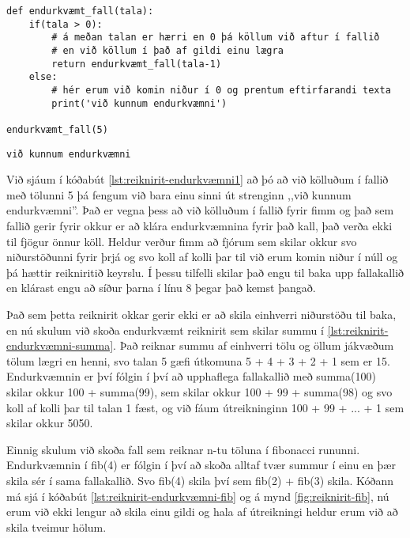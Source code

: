 \begin{lstlisting}[caption=Endurkvæmni - einfalt, label=lst:reiknirit-endurkvæmni1]
def endurkvæmt_fall(tala):
	if(tala > 0):
		# á meðan talan er hærri en 0 þá köllum við aftur í fallið
		# en við köllum í það af gildi einu lægra
		return endurkvæmt_fall(tala-1)
	else:
		# hér erum við komin niður í 0 og prentum eftirfarandi texta
		print('við kunnum endurkvæmni')
		
endurkvæmt_fall(5)
\end{lstlisting}
\lstset{style=uttak}
\begin{lstlisting}
við kunnum endurkvæmni
\end{lstlisting}
\lstset{style=venjulegt}

Við sjáum í kóðabút \ref{lst:reiknirit-endurkvæmni1} að þó að við kölluðum í fallið með tölunni 5 þá fengum við bara einu sinni út strenginn ,,við kunnum endurkvæmni''.
Það er vegna þess að við kölluðum í fallið fyrir fimm og það sem fallið gerir fyrir okkur er að klára endurkvæmnina fyrir það kall, það verða ekki til fjögur önnur köll.
Heldur verður fimm að fjórum sem skilar okkur svo niðurstöðunni fyrir þrjá og svo koll af kolli þar til við erum komin niður í núll og þá hættir reikniritið keyrslu.
Í þessu tilfelli skilar það engu til baka upp fallakallið en klárast engu að síður þarna í línu 8 þegar það kemst þangað.


Það sem þetta reiknirit okkar gerir ekki er að skila einhverri niðurstöðu til baka, en nú skulum við skoða endurkvæmt reiknirit sem skilar summu í  \ref{lst:reiknirit-endurkvæmni-summa}.
Það reiknar summu af einhverri tölu og öllum jákvæðum tölum lægri en henni, svo talan 5 gæfi útkomuna 5 + 4 + 3 + 2 + 1 sem er 15.
Endurkvæmnin er því fólgin í því að upphaflega fallakallið með summa(100) skilar okkur 100 + summa(99), sem skilar okkur 100 + 99 + summa(98) og svo koll af kolli þar til talan 1 fæst, og við fáum útreikninginn 100 + 99 + ... + 1 sem skilar okkur 5050.

Einnig skulum við skoða fall sem reiknar n-tu töluna í fibonacci rununni.
Endurkvæmnin í fib(4) er fólgin í því að skoða alltaf tvær summur í einu en þær skila sér í sama fallakallið.
Svo fib(4) skila því sem fib(2) + fib(3) skila.
Kóðann má sjá í kóðabút \ref{lst:reiknirit-endurkvæmni-fib} og á mynd \ref{fig:reiknirit-fib}, nú erum við ekki lengur að skila einu gildi og hala af útreikningi heldur erum við að skila tveimur hölum.

